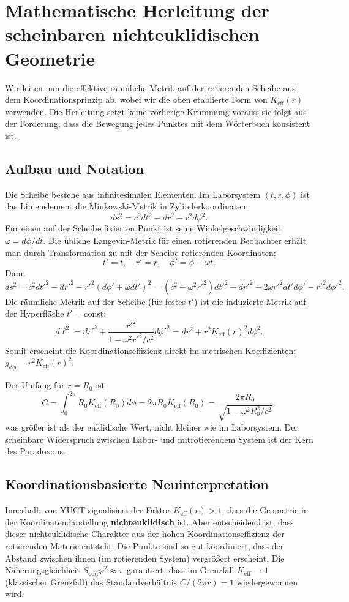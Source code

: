 \documentclass[12pt,a4paper]{article}
\newcommand{\Sodd}{S_{\mathrm{odd}}}
\begin{document}
	\section{Mathematische Herleitung der scheinbaren nichteuklidischen Geometrie}
	\label{sec:derivation}
	
	Wir leiten nun die effektive räumliche Metrik auf der rotierenden Scheibe aus dem Koordinationsprinzip ab, wobei wir die oben etablierte Form von \(K_{\mathrm{eff}}(r)\) verwenden. Die Herleitung setzt keine vorherige Krümmung voraus; sie folgt aus der Forderung, dass die Bewegung jedes Punktes mit dem Wörterbuch konsistent ist.
	
	\subsection{Aufbau und Notation}
	Die Scheibe bestehe aus infinitesimalen Elementen. Im Laborsystem \((t, r, \phi)\) ist das Linienelement die Minkowski-Metrik in Zylinderkoordinaten:
	\[
	ds^2 = c^2 dt^2 - dr^2 - r^2 d\phi^2.
	\]
	Für einen auf der Scheibe fixierten Punkt ist seine Winkelgeschwindigkeit \(\omega = d\phi/dt\). Die übliche Langevin-Metrik für einen rotierenden Beobachter erhält man durch Transformation zu mit der Scheibe rotierenden Koordinaten:
	\[
	t' = t,\quad r' = r,\quad \phi' = \phi - \omega t.
	\]
	Dann
	\[
	ds^2 = c^2 dt'^2 - dr'^2 - r'^2 (d\phi' + \omega dt')^2 = (c^2 - \omega^2 r'^2) dt'^2 - dr'^2 - 2\omega r'^2 dt' d\phi' - r'^2 d\phi'^2.
	\]
	Die räumliche Metrik auf der Scheibe (für festes \(t'\)) ist die induzierte Metrik auf der Hyperfläche \(t' = \text{const}\):
	\[
	d\ell^2 = dr'^2 + \frac{r'^2}{1 - \omega^2 r'^2/c^2} d\phi'^2 = dr^2 + r^2 K_{\mathrm{eff}}(r)^2 d\phi^2.
	\]
	Somit erscheint die Koordinationseffizienz direkt im metrischen Koeffizienten: \(g_{\phi\phi} = r^2 K_{\mathrm{eff}}(r)^2\).
	
	Der Umfang für \(r = R_0\) ist
	\[
	C = \int_0^{2\pi} R_0 K_{\mathrm{eff}}(R_0) d\phi = 2\pi R_0 K_{\mathrm{eff}}(R_0) = \frac{2\pi R_0}{\sqrt{1 - \omega^2 R_0^2/c^2}},
	\]
	was größer ist als der euklidische Wert, nicht kleiner wie im Laborsystem. Der scheinbare Widerspruch zwischen Labor- und mitrotierendem System ist der Kern des Paradoxons.
	
	\subsection{Koordinationsbasierte Neuinterpretation}
	Innerhalb von YUCT signalisiert der Faktor \(K_{\mathrm{eff}}(r) > 1\), dass die Geometrie in der Koordinatendarstellung \textbf{nichteuklidisch} ist. Aber entscheidend ist, dass dieser nichteuklidische Charakter aus der hohen Koordinationseffizienz der rotierenden Materie entsteht: Die Punkte sind so gut koordiniert, dass der Abstand zwischen ihnen (im rotierenden System) vergrößert erscheint. Die Näherungsgleichheit \(\Sodd \varphi^2 \approx \pi\) garantiert, dass im Grenzfall \(K_{\mathrm{eff}} \to 1\) (klassischer Grenzfall) das Standardverhältnis \(C/(2\pi r) = 1\) wiedergewonnen wird.
	
\end{document}
